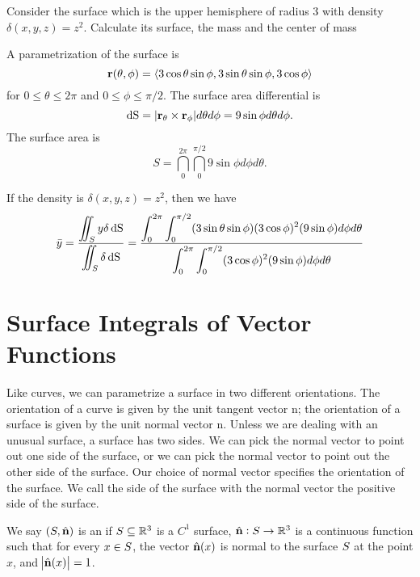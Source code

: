 \begin{exa}
  Consider the surface which is the upper hemisphere of radius 3 with density  $\delta(x,y,z) = z^2$. Calculate its surface, the mass and the center of mass
\end{exa}
\begin{solu}


  A
  parametrization of the surface is
  \[\mathbf{ r} (\theta,\phi) =
    \langle3\cos\theta\sin\phi,3\sin\theta\sin\phi,3\cos\phi\rangle\]
  for {$0\leq \theta\leq 2\pi$} and {$0\leq \phi\leq \pi/2$}. The
  surface area differential is
  \[\d \S = |\vector{r}_\theta\times\vector{r}_\phi|d\theta d\phi = 9\sin \phi d\theta d\phi.\]
    The surface
  area is
  \[S = \dint_{0}^{2\pi} \dint_{0}^{\pi/2} 9\sin \phi d\phi
  d\theta.\]

  If the density is $\delta(x,y,z) = z^2$, then we have
  \begin{align*}
    \bar y &= \frac{\diint_S y \delta
     \d \S}{\diint_S \delta\d \S} = \frac {\dint_{0}^{2\pi}
      \dint_{0}^{\pi/2} (3\sin\theta\sin\phi)(3\cos\phi)^2(9\sin \phi)
      d\phi d\theta}
    {\dint_{0}^{2\pi} \dint_{0}^{\pi/2} (3\cos\phi)^2(9\sin \phi) d\phi d\theta}\\
  \end{align*}
\end{solu}




  \section{Surface Integrals of Vector Functions}


Like curves, we can parametrize a surface in two different orientations. The orientation of a curve is given by the unit tangent vector n; the orientation of a surface is given by the unit normal vector n. Unless we are dealing with an unusual surface, a surface has two sides. We can pick the normal vector to point out one side of the surface, or we can pick the normal vector to point out the other side of the surface. Our choice of normal vector specifies the orientation of the surface. We call the side of the surface with the normal vector the positive side of the surface.

  \begin{definition}
    We say $(S, \hat{ \mathbf{ n}})$ is an  if $S \subseteq \mathbb{R}^3$ is a $C^1$ surface, $\hat{ \mathbf{ n}}: S \to \mathbb{R}^3$ is a continuous function such that for every $x \in S$, the vector $\hat{ \mathbf{ n}}(x)$ is normal to the surface $S$ at the point $x$, and $\abs{\hat{ \mathbf{ n}}(x)} = 1$.
  \end{definition}

